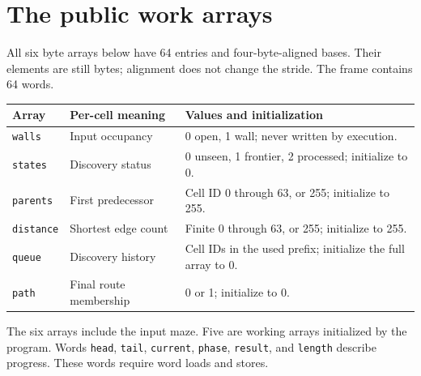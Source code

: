 \section{The public work arrays}\label{maze-x-storage}
All six byte arrays below have 64 entries and four-byte-aligned bases. Their elements
are still bytes; alignment does not change the stride. The frame contains 64 words.
\begin{longtable}{@{}p{28mm}p{43mm}p{87mm}@{}}
  \toprule
  Array             & Per-cell meaning       & Values and initialization                                    \\\midrule\endhead
  \texttt{walls}    & Input occupancy        & 0 open, 1 wall; never written by execution.                  \\
  \texttt{states}   & Discovery status       & 0 unseen, 1 frontier, 2 processed; initialize to 0.          \\
  \texttt{parents}  & First predecessor      & Cell ID 0 through 63, or 255; initialize to 255.             \\
  \texttt{distance} & Shortest edge count    & Finite 0 through 63, or 255; initialize to 255.              \\
  \texttt{queue}    & Discovery history      & Cell IDs in the used prefix; initialize the full array to 0. \\
  \texttt{path}     & Final route membership & 0 or 1; initialize to 0.                                     \\
  \bottomrule
\end{longtable}
The six arrays include the input maze. Five are working arrays initialized by the program.
Words \texttt{head}, \texttt{tail}, \texttt{current}, \texttt{phase}, \texttt{result},
and \texttt{length} describe progress. These words require word loads and stores.
